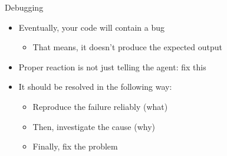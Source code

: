 \documentclass[
ps,
]{prosper}
\begin{document}
\begin{slide}{Debugging}

\begin{itemize}

\item Eventually, your code will contain a bug

  \begin{itemize}
    
  \item That means, it doesn't produce the expected output
    
  \end{itemize}

\item Proper reaction is not just telling the agent: fix this

\item It should be resolved in the following way:

  \begin{itemize}
    
  \item Reproduce the failure reliably (what)

  \item Then, investigate the cause (why)

  \item Finally, fix the problem
    
  \end{itemize}

\end{itemize}
  
\end{slide}
\end{document}
